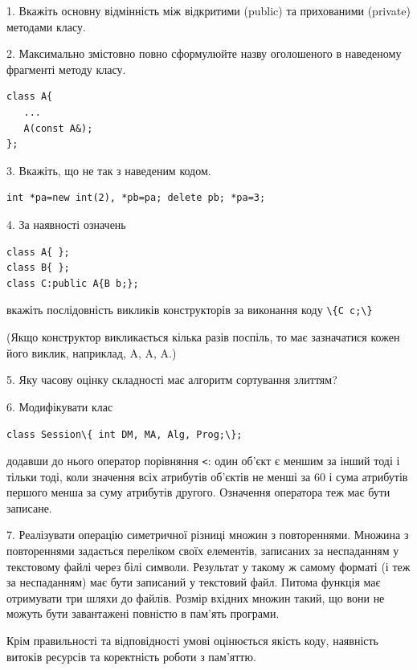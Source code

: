 \documentclass[12pt, ukrainian]{article}
\def\code#1{\Verb!#1!}
\begin{document}
{%
1. Вкажіть основну відмінність між відкритими (public) та прихованими (private) методами класу.%
\par
\vspace{2mm}
2. Максимально змістовно повно сформулюйте назву оголошеного в наведеному фрагменті методу класу.
\vspace{-3mm}
\begin{verbatim}class A{
   ...
   A(const A&);
};\end{verbatim}
\vspace{-3mm}
\par
\vspace{2mm}
3. Вкажіть, що не так з наведеним кодом.
\vspace{-3mm}
\begin{verbatim}int *pa=new int(2), *pb=pa; delete pb; *pa=3;\end{verbatim}
\vspace{-3mm}
\par
\vspace{2mm}
4. За наявності означень
\vspace{-3mm}
\begin{verbatim}
class A{ };
class B{ };
class C:public A{B b;};\end{verbatim}
\vspace{-3mm}
вкажіть послідовність викликів конструкторів за виконання коду \code{\{C c;\}} 

(Якщо конструктор викликається кілька разів поспіль, то має зазначатися кожен його виклик, наприклад, A, A, A.)

\vspace{2mm}
5. Яку часову оцінку складності має алгоритм сортування злиттям?
\par
\vspace{2mm}
6. Модифікувати клас 

\qquad\code{class Session\{ int DM, MA, Alg, Prog;\};} 


додавши до нього оператор порівняння \code{<}: один об'єкт є меншим за інший тоді і тільки тоді, коли значення всіх атрибутів об'єктів не менші за 60 і сума атрибутів першого менша за суму атрибутів другого. Означення оператора теж має бути записане.%
\par
\vspace{2mm}
7. 
Реалізувати операцію симетричної різниці множин з повтореннями. Множина з повтореннями задається переліком своїх елементів, записаних за неспаданням у текстовому файлі через білі символи. Результат у такому ж самому форматі (і теж за неспаданням) має бути записаний у текстовий файл. Питома функція має отримувати три шляхи до файлів. Розмір вхідних множин такий, що вони не можуть бути завантажені повністю в пам’ять програми.

Крім правильності та відповідності умові оцінюється якість коду, наявність витоків ресурсів та коректність роботи з пам'яттю. 

}
\end{document}
